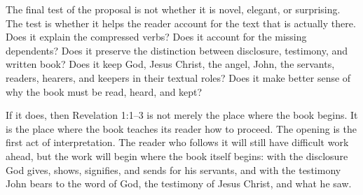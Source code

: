 The final test of the proposal is not whether it is novel, elegant, or surprising. The test is whether it helps the reader account for the text that is actually there. Does it explain the compressed verbs? Does it account for the missing dependents? Does it preserve the distinction between disclosure, testimony, and written book? Does it keep God, Jesus Christ, the angel, John, the servants, readers, hearers, and keepers in their textual roles? Does it make better sense of why the book must be read, heard, and kept?

If it does, then Revelation 1:1--3 is not merely the place where the book begins. It is the place where the book teaches its reader how to proceed. The opening is the first act of interpretation. The reader who follows it will still have difficult work ahead, but the work will begin where the book itself begins: with the disclosure God gives, shows, signifies, and sends for his servants, and with the testimony John bears to the word of God, the testimony of Jesus Christ, and what he saw.

